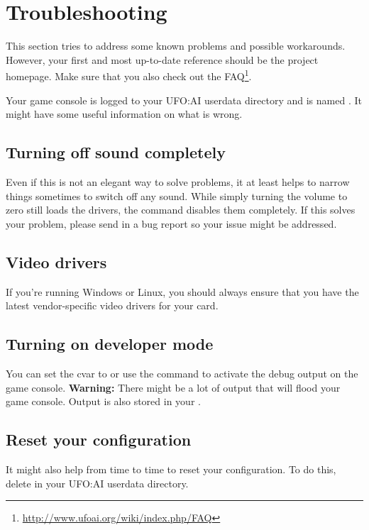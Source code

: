 \section{Troubleshooting}
This section tries to address some known problems and possible workarounds. However, your first and most up-to-date reference should be the project homepage. Make sure that you also check out the FAQ\footnote{\url{http://www.ufoai.org/wiki/index.php/FAQ}}.

Your game console is logged to your UFO:AI userdata directory and is named . It might have some useful information on what is wrong.

\subsection{Turning off sound completely}
Even if this is not an elegant way to solve problems, it at least helps to narrow things sometimes to switch off any sound. While simply turning the volume to zero still loads the drivers, the command   disables them completely. If this solves your problem, please send in a bug report so your issue might be addressed.

\subsection{Video drivers}
If you're running Windows or Linux, you should always ensure that you have the latest vendor-specific video drivers for your card.

\subsection{Turning on developer mode}
You can set the cvar  to  or use the  command to activate the debug output on the game console. \textbf{Warning:} There might be a lot of output that will flood your game console. Output is also stored in your .

\subsection{Reset your configuration}
It might also help from time to time to reset your configuration. To do this, delete  in your UFO:AI userdata directory.
